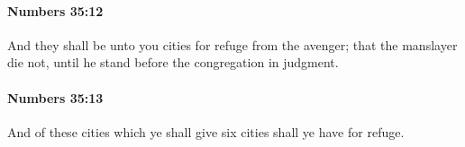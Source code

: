 		\paragraph{Numbers 35:12} %
			\label{NUMBERS-35-12}

			And they shall be unto you cities for refuge from the avenger; that the manslayer die not, until he stand before the congregation in judgment.


		\paragraph{Numbers 35:13} %
			\label{NUMBERS-35-13}

			And of these cities which ye shall give six cities shall ye have for refuge.



